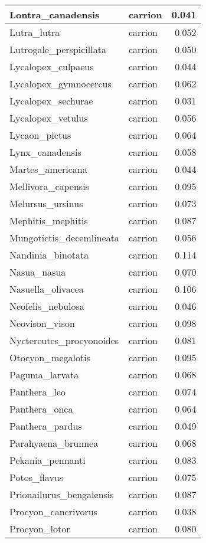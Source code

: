 \begin{table}
\begin{tabular}[t]{l|l|r}
\hline
Lontra\_canadensis & carrion & 0.041\\
\hline
Lutra\_lutra & carrion & 0.052\\
\hline
Lutrogale\_perspicillata & carrion & 0.050\\
\hline
Lycalopex\_culpaeus & carrion & 0.044\\
\hline
Lycalopex\_gymnocercus & carrion & 0.062\\
\hline
Lycalopex\_sechurae & carrion & 0.031\\
\hline
Lycalopex\_vetulus & carrion & 0.056\\
\hline
Lycaon\_pictus & carrion & 0.064\\
\hline
Lynx\_canadensis & carrion & 0.058\\
\hline
Martes\_americana & carrion & 0.044\\
\hline
Mellivora\_capensis & carrion & 0.095\\
\hline
Melursus\_ursinus & carrion & 0.073\\
\hline
Mephitis\_mephitis & carrion & 0.087\\
\hline
Mungotictis\_decemlineata & carrion & 0.056\\
\hline
Nandinia\_binotata & carrion & 0.114\\
\hline
Nasua\_nasua & carrion & 0.070\\
\hline
Nasuella\_olivacea & carrion & 0.106\\
\hline
Neofelis\_nebulosa & carrion & 0.046\\
\hline
Neovison\_vison & carrion & 0.098\\
\hline
Nyctereutes\_procyonoides & carrion & 0.081\\
\hline
Otocyon\_megalotis & carrion & 0.095\\
\hline
Paguma\_larvata & carrion & 0.068\\
\hline
Panthera\_leo & carrion & 0.074\\
\hline
Panthera\_onca & carrion & 0.064\\
\hline
Panthera\_pardus & carrion & 0.049\\
\hline
Parahyaena\_brunnea & carrion & 0.068\\
\hline
Pekania\_pennanti & carrion & 0.083\\
\hline
Potos\_flavus & carrion & 0.075\\
\hline
Prionailurus\_bengalensis & carrion & 0.087\\
\hline
Procyon\_cancrivorus & carrion & 0.038\\
\hline
Procyon\_lotor & carrion & 0.080\\

\end{tabular}
\end{table}

